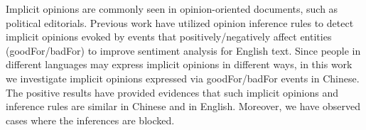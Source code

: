 Implicit opinions are commonly seen in opinion-oriented documents, such as political editorials. Previous work have utilized opinion inference rules to detect implicit opinions evoked by events that positively/negatively affect entities (goodFor/badFor) to improve sentiment analysis for English text. Since people in different languages may express implicit opinions in different ways, in this work we investigate implicit opinions expressed via goodFor/badFor events in Chinese. The positive results have provided evidences that such implicit opinions and inference rules are similar in Chinese and in English. Moreover, we have observed cases where the inferences are blocked.
